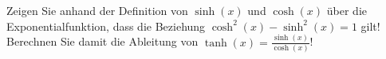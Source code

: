 \item Zeigen Sie anhand der Definition von $\sinh(x)$ und $\cosh(x)$ über die Exponentialfunktion, dass die Beziehung $\cosh^2(x)-\sinh^2(x)=1$ gilt! Berechnen Sie damit die Ableitung von $\tanh(x) = \frac{\sinh(x)}{\cosh(x)}$!
